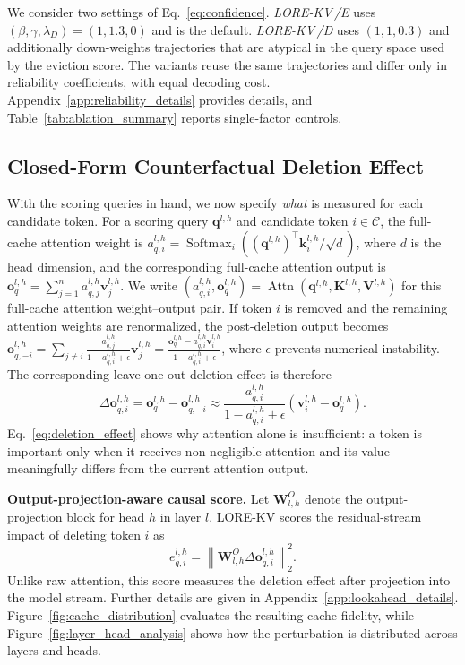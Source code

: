 \documentclass{article} %
\newcommand{\lorekvE}{LORE-KV\,/E}
\newcommand{\lorekvD}{LORE-KV\,/D}
\begin{document}
We consider two settings of Eq.~\eqref{eq:confidence}. \emph{\lorekvE} uses $(\beta,\gamma,\lambda_D)=(1,1.3,0)$ and is the default. \emph{\lorekvD} uses $(1,1,0.3)$ and additionally down-weights trajectories that are atypical in the query space used by the eviction score. The variants reuse the same trajectories and differ only in reliability coefficients, with equal decoding cost. Appendix~\ref{app:reliability_details} provides details, and Table~\ref{tab:ablation_summary} reports single-factor controls.

\subsection{Closed-Form Counterfactual Deletion Effect} \label{subsec:deletion}
With the scoring queries in hand, we now specify \emph{what} is measured for each candidate token. For a scoring query $\mathbf{q}^{l,h}$ and candidate token $i\in\mathcal{C}$, the full-cache attention weight is
$a^{l,h}_{q,i}=\operatorname{Softmax}_i\!\left((\mathbf{q}^{l,h})^\top\mathbf{k}^{l,h}_{i}/\sqrt{d}\right)$,
where $d$ is the head dimension, and the corresponding full-cache attention output is
$\mathbf{o}^{l,h}_{q}=\sum_{j=1}^{n}a^{l,h}_{q,j}\mathbf{v}^{l,h}_{j}$.
We write
$(a^{l,h}_{q,i},\mathbf{o}^{l,h}_{q})
=\operatorname{Attn}(\mathbf{q}^{l,h},\mathbf{K}^{l,h},\mathbf{V}^{l,h})$
for this full-cache attention weight--output pair. If token $i$ is removed and the remaining attention weights are renormalized, the post-deletion output becomes
$\mathbf{o}^{l,h}_{q,-i}
=\sum_{j\neq i}\frac{a^{l,h}_{q,j}}{1-a^{l,h}_{q,i}+\epsilon}\mathbf{v}^{l,h}_{j}
=\frac{\mathbf{o}^{l,h}_{q}-a^{l,h}_{q,i}\mathbf{v}^{l,h}_{i}}
{1-a^{l,h}_{q,i}+\epsilon}$,
where $\epsilon$ prevents numerical instability. The corresponding leave-one-out deletion effect is therefore
\begin{equation}
\Delta\mathbf{o}^{l,h}_{q,i}
=\mathbf{o}^{l,h}_{q}-\mathbf{o}^{l,h}_{q,-i}
\approx
\frac{a^{l,h}_{q,i}}{1-a^{l,h}_{q,i}+\epsilon}
\left(\mathbf{v}^{l,h}_{i}-\mathbf{o}^{l,h}_{q}\right).
\label{eq:deletion_effect}
\end{equation}
Eq.~\eqref{eq:deletion_effect} shows why attention alone is insufficient: a token is important only when it receives non-negligible attention and its value meaningfully differs from the current attention output.

\textbf{Output-projection-aware causal score.}
Let $\mathbf{W}^{O}_{l,h}$ denote the output-projection block for head $h$ in layer $l$. LORE-KV scores the residual-stream impact of deleting token $i$ as
\begin{equation}
e^{l,h}_{q,i}
=
\left\|
\mathbf{W}^{O}_{l,h}\Delta\mathbf{o}^{l,h}_{q,i}
\right\|_2^2 .
\label{eq:projected_score}
\end{equation}
Unlike raw attention, this score measures the deletion effect after projection into the model stream. Further details are given in Appendix~\ref{app:lookahead_details}. Figure~\ref{fig:cache_distribution} evaluates the resulting cache fidelity, while Figure~\ref{fig:layer_head_analysis} shows how the perturbation is distributed across layers and heads.
\end{document}
